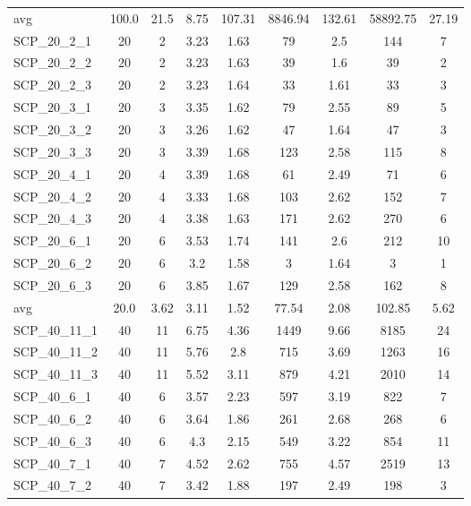 \begin{table}[!ht]
{\begin{tabular}{lcccccccc}
\cline{1-9} avg & 100.0 & 21.5 & 8.75 & 107.31& 8846.94 & 132.61& 58892.75 & 27.19\\ \cline{1-9}
SCP\_20\_2\_1 & 20 & 2 & 3.23 &  \textcolor{blue2}{1.63} & 79 & 2.5 & 144 & 7 \\
SCP\_20\_2\_2 & 20 & 2 & 3.23 & 1.63 & 39 &  \textcolor{blue2}{1.6} & 39 & 2 \\
SCP\_20\_2\_3 & 20 & 2 & 3.23 & 1.64 & 33 &  \textcolor{blue2}{1.61} & 33 & 3 \\
SCP\_20\_3\_1 & 20 & 3 & 3.35 &  \textcolor{blue2}{1.62} & 79 & 2.55 & 89 & 5 \\
SCP\_20\_3\_2 & 20 & 3 & 3.26 &  \textcolor{blue2}{1.62} & 47 & 1.64 & 47 & 3 \\
SCP\_20\_3\_3 & 20 & 3 & 3.39 &  \textcolor{blue2}{1.68} & 123 & 2.58 & 115 & 8 \\
SCP\_20\_4\_1 & 20 & 4 & 3.39 &  \textcolor{blue2}{1.68} & 61 & 2.49 & 71 & 6 \\
SCP\_20\_4\_2 & 20 & 4 & 3.33 &  \textcolor{blue2}{1.68} & 103 & 2.62 & 152 & 7 \\
SCP\_20\_4\_3 & 20 & 4 & 3.38 &  \textcolor{blue2}{1.63} & 171 & 2.62 & 270 & 6 \\
SCP\_20\_6\_1 & 20 & 6 & 3.53 &  \textcolor{blue2}{1.74} & 141 & 2.6 & 212 & 10 \\
SCP\_20\_6\_2 & 20 & 6 & 3.2 &  \textcolor{blue2}{1.58} & 3 & 1.64 & 3 & 1 \\
SCP\_20\_6\_3 & 20 & 6 & 3.85 &  \textcolor{blue2}{1.67} & 129 & 2.58 & 162 & 8 \\
\cline{1-9} avg & 20.0 & 3.62 & 3.11 & 1.52& 77.54 & 2.08& 102.85 & 5.62\\ \cline{1-9}
SCP\_40\_11\_1 & 40 & 11 & 6.75 &  \textcolor{blue2}{4.36} & 1449 & 9.66 & 8185 & 24 \\
SCP\_40\_11\_2 & 40 & 11 & 5.76 &  \textcolor{blue2}{2.8} & 715 & 3.69 & 1263 & 16 \\
SCP\_40\_11\_3 & 40 & 11 & 5.52 &  \textcolor{blue2}{3.11} & 879 & 4.21 & 2010 & 14 \\
SCP\_40\_6\_1 & 40 & 6 & 3.57 &  \textcolor{blue2}{2.23} & 597 & 3.19 & 822 & 7 \\
SCP\_40\_6\_2 & 40 & 6 & 3.64 &  \textcolor{blue2}{1.86} & 261 & 2.68 & 268 & 6 \\
SCP\_40\_6\_3 & 40 & 6 & 4.3 &  \textcolor{blue2}{2.15} & 549 & 3.22 & 854 & 11 \\
SCP\_40\_7\_1 & 40 & 7 & 4.52 &  \textcolor{blue2}{2.62} & 755 & 4.57 & 2519 & 13 \\
SCP\_40\_7\_2 & 40 & 7 & 3.42 &  \textcolor{blue2}{1.88} & 197 & 2.49 & 198 & 3 \\

\end{tabular}}
\end{table}
